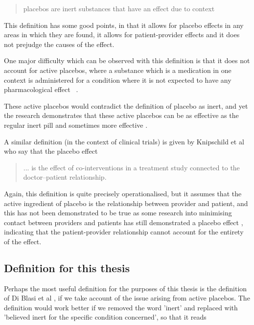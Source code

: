 \begin{quotation}
  placebos are inert substances that have an effect due to context
\end{quotation}

This definition has some good points, in that it allows for placebo effects in any areas in which they are found, it allows for patient-provider effects and it does not prejudge the causes of the effect. 

One major difficulty which can be observed with this definition is that it does not account for active placebos, where a substance which is a medication in one context is administered for a condition where it is not expected to have any pharmacological effect~\cite{Kirsch1998} . 

These active placebos would contradict the definition of placebo as inert, and yet the research demonstrates that these active placebos can be as effective as the regular inert pill \cite{Flaten2004} and sometimes more effective \cite{Kirsch2002a}. 


A similar definition (in the context of clinical trials) is given by Knipschild et al \cite{Knipschild2005} who say that the placebo effect

\begin{quotation}
... is the effect of co-interventions in a
treatment study connected to the doctor--patient relationship.
\end{quotation}

Again, this definition is quite precisely operationalised, but it assumes that the active ingredient of placebo is the relationship between provider and patient, and this has not been demonstrated to be true as some research into minimising contact between providers and patients has still demonstrated a placebo effect \cite{Hyland2006}, indicating that the patient-provider relationship cannot account for the entirety of the effect.  



\subsection{Definition for this thesis}
\label{sec:defin-this-thes}


Perhaps the most useful definition for the purposes of this thesis is the definition of Di Blasi et al \cite{DiBlasi2001}, if we take account of the issue arising from active placebos. The definition would work better if we removed the word 'inert' and replaced with 'believed inert for the specific condition concerned', so that it reads

